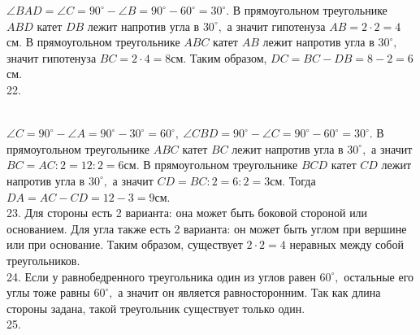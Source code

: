 \documentclass[12pt]{article}
\begin{document}
$\angle BAD=\angle C=90^\circ-\angle B=90^\circ-60^\circ=30^\circ.$ В прямоугольном треугольнике $ABD$ катет $DB$ лежит напротив угла в $30^\circ,$ а значит гипотенуза $AB=2\cdot2=4$см. В прямоугольном треугольнике $ABC$ катет $AB$ лежит напротив угла в $30^\circ,$ значит гипотенуза $BC=2\cdot4=8$см. Таким образом, $DC=BC-DB=8-2=6$см.\\
22. \begin{figure}[ht!]
\end{figure}\\
$\angle C=90^\circ-\angle A=90^\circ-30^\circ=60^\circ,\ \angle CBD=90^\circ-\angle C=90^\circ-60^\circ=30^\circ.$ В прямоугольном треугольнике $ABC$ катет $BC$ лежит напротив угла в $30^\circ,$ а значит $BC=AC:2=12:2=6$см. В прямоугольном треугольнике $BCD$ катет $CD$ лежит напротив угла в $30^\circ,$ а значит $CD=BC:2=6:2=3$см. Тогда $DA=AC-CD=12-3=9$см.\\
23. Для стороны есть 2 варианта: она может быть боковой стороной или основанием. Для угла также есть 2 варианта: он может быть углом при вершине или при основание. Таким образом, существует $2\cdot2=4$ неравных между собой треугольников.\\
24. Если у равнобедренного треугольника один из углов равен $60^\circ,$ остальные его углы тоже равны $60^\circ,$ а значит он является равносторонним. Так как длина стороны задана, такой треугольник существует только один.\\
25. \begin{figure}[ht!]
\end{figure}\\
\end{document}
